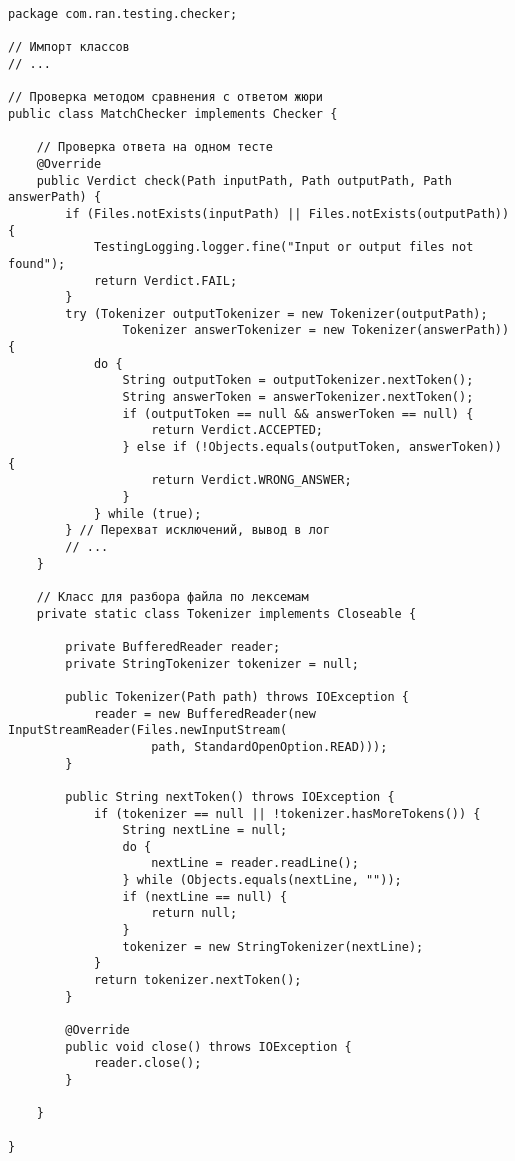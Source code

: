 \begin{verbatim}
package com.ran.testing.checker;

// Импорт классов
// ...

// Проверка методом сравнения с ответом жюри
public class MatchChecker implements Checker {
    
    // Проверка ответа на одном тесте
    @Override
    public Verdict check(Path inputPath, Path outputPath, Path answerPath) {
        if (Files.notExists(inputPath) || Files.notExists(outputPath)) {
            TestingLogging.logger.fine("Input or output files not found");
            return Verdict.FAIL;
        }
        try (Tokenizer outputTokenizer = new Tokenizer(outputPath);
                Tokenizer answerTokenizer = new Tokenizer(answerPath)) {
            do {
                String outputToken = outputTokenizer.nextToken();
                String answerToken = answerTokenizer.nextToken();
                if (outputToken == null && answerToken == null) {
                    return Verdict.ACCEPTED;
                } else if (!Objects.equals(outputToken, answerToken)) {
                    return Verdict.WRONG_ANSWER;
                }
            } while (true);
        } // Перехват исключений, вывод в лог
        // ...
    }
    
    // Класс для разбора файла по лексемам
    private static class Tokenizer implements Closeable {

        private BufferedReader reader;
        private StringTokenizer tokenizer = null;
        
        public Tokenizer(Path path) throws IOException {
            reader = new BufferedReader(new InputStreamReader(Files.newInputStream(
                    path, StandardOpenOption.READ)));
        }
        
        public String nextToken() throws IOException {
            if (tokenizer == null || !tokenizer.hasMoreTokens()) {
                String nextLine = null;
                do {
                    nextLine = reader.readLine();
                } while (Objects.equals(nextLine, ""));
                if (nextLine == null) {
                    return null;
                }
                tokenizer = new StringTokenizer(nextLine);
            }
            return tokenizer.nextToken();
        }
        
        @Override
        public void close() throws IOException {
            reader.close();
        }
        
    }
    
}
\end{verbatim}